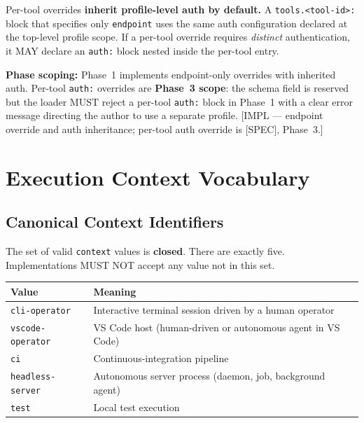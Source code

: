 Per-tool overrides \textbf{inherit profile-level auth by default.}  A
\texttt{tools.<tool-id>:} block that specifies only \texttt{endpoint}
uses the same auth configuration declared at the top-level profile scope.
If a per-tool override requires \emph{distinct} authentication, it MAY
declare an \texttt{auth:} block nested inside the per-tool entry.

\textbf{Phase scoping:} Phase~1 implements endpoint-only overrides with
inherited auth.  Per-tool \texttt{auth:} overrides are \textbf{Phase~3
scope}: the schema field is reserved but the loader MUST reject a per-tool
\texttt{auth:} block in Phase~1 with a clear error message directing the
author to use a separate profile.  [IMPL — endpoint override and auth
inheritance; per-tool auth override is [SPEC], Phase~3.]

\section{Execution Context Vocabulary}
\label{sec:rp-context-vocab}

\subsection{Canonical Context Identifiers}
\label{subsec:rp-context-values}

The set of valid \texttt{context} values is \textbf{closed}.  There are exactly
five.  Implementations MUST NOT accept any value not in this set.

\begin{center}
\begin{tabular}{ll}
\toprule
\textbf{Value} & \textbf{Meaning} \\
\midrule
\texttt{cli-operator}     & Interactive terminal session driven by a human operator \\
\texttt{vscode-operator}  & VS Code host (human-driven or autonomous agent in VS Code) \\
\texttt{ci}               & Continuous-integration pipeline \\
\texttt{headless-server}  & Autonomous server process (daemon, job, background agent) \\
\texttt{test}             & Local test execution \\
\bottomrule
\end{tabular}
\end{center}

